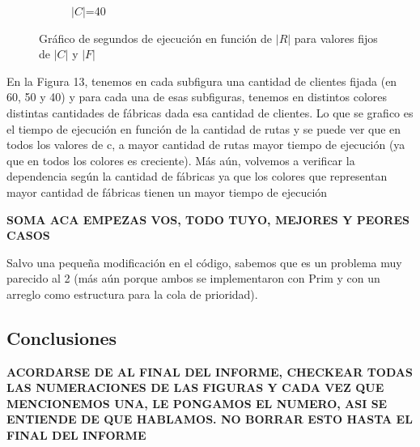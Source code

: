\documentclass[A4paper,oneside,fleqn,11pt]{article}
\theoremstyle{definition}
\begin{document}
\begin{figure}[H]
\begin{subfigure}[b]{0.3\textwidth}
        \caption{$|C|$=40}
        \label{ni se pa que sirve esto}
    \end{subfigure}    
    \caption{Gráfico de segundos de ejecución en función de $|R|$ para valores fijos de $|C|$ y $|F|$}
\end{figure}

En la Figura 13, tenemos en cada subfigura una cantidad de clientes fijada (en 60, 50 y 40) y para cada una de esas subfiguras, tenemos en distintos colores distintas cantidades de fábricas dada esa cantidad de clientes. Lo que se grafico es el tiempo de ejecución en función de la cantidad de rutas y se puede ver que en todos los valores de c, a mayor cantidad de rutas mayor tiempo de ejecución (ya que en todos los colores es creciente). Más aún, volvemos a verificar la dependencia según la cantidad de fábricas ya que los colores que representan mayor cantidad de fábricas  tienen un mayor tiempo de ejecución

\textbf{SOMA ACA EMPEZAS VOS, TODO TUYO, MEJORES Y PEORES CASOS}



Salvo una pequeña modificación en el código, sabemos que es un problema muy parecido al 2 (más aún porque ambos se implementaron con Prim y con un arreglo como estructura para la cola de prioridad). 

\subsection{Conclusiones}


\textbf{ACORDARSE DE AL FINAL DEL INFORME, CHECKEAR TODAS LAS NUMERACIONES DE LAS FIGURAS Y CADA VEZ QUE MENCIONEMOS UNA, LE PONGAMOS EL NUMERO, ASI SE ENTIENDE DE QUE HABLAMOS. NO BORRAR ESTO HASTA EL FINAL DEL INFORME}
\end{document}

